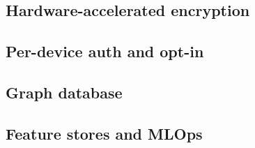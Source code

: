 \subsection{Hardware-accelerated encryption}
\label{chapter4-hardware-accelerated-encryption}

\subsection{Per-device auth and opt-in}
\label{chapter4-user-side-opt-in}

\subsection{Graph database}
\label{chapter4-graph-database}

\subsection{Feature stores and MLOps}
\label{chapter4-feature-stores-and-mlops}

